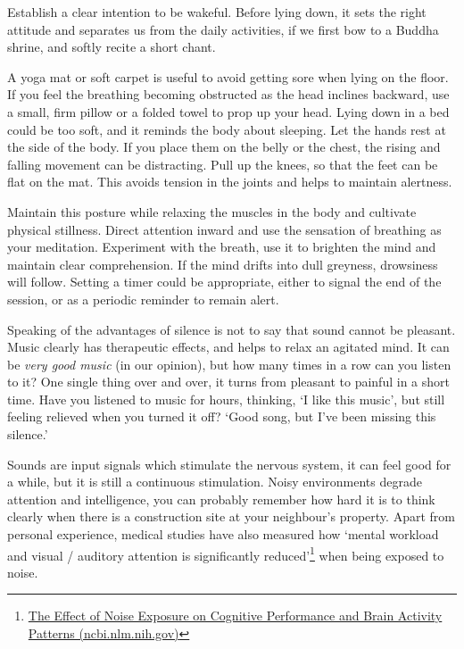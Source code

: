 Establish a clear intention to be wakeful. Before lying down, it sets
the right attitude and separates us from the daily activities, if we
first bow to a Buddha shrine, and softly recite a short chant.

\clearpage
\thispagestyle{empty}\mbox{}
\clearpage

A yoga mat or soft carpet is useful to avoid getting sore when lying on
the floor. If you feel the breathing becoming obstructed as the head
inclines backward, use a small, firm pillow or a folded towel to prop up
your head. Lying down in a bed could be too soft, and it reminds the
body about sleeping. Let the hands rest at the side of the body. If you
place them on the belly or the chest, the rising and falling movement
can be distracting. Pull up the knees, so that the feet can be flat on
the mat. This avoids tension in the joints and helps to maintain
alertness.

Maintain this posture while relaxing the muscles in the body and
cultivate physical stillness. Direct attention inward and use the
sensation of breathing as your meditation. Experiment with the breath,
use it to brighten the mind and maintain clear comprehension. If the
mind drifts into dull greyness, drowsiness will follow. Setting a timer
could be appropriate, either to signal the end of the session, or as a
periodic reminder to remain alert.


Speaking of the advantages of silence is not to say that sound cannot be
pleasant. Music clearly has therapeutic effects, and helps to relax an
agitated mind. It can be \emph{very good music} (in our opinion), but
how many times in a row can you listen to it? One single thing over and
over, it turns from pleasant to painful in a short time. Have you
listened to music for hours, thinking, `I like this music', but still
feeling relieved when you turned it off? `Good song, but I've been
missing this silence.'

Sounds are input signals which stimulate the nervous system, it can feel
good for a while, but it is still a continuous stimulation. Noisy
environments degrade attention and intelligence, you can probably
remember how hard it is to think clearly when there is a construction
site at your neighbour's property. Apart from personal experience,
medical studies have also measured how `mental workload and visual /
auditory attention is significantly reduced'\footnote{\href{https://www.ncbi.nlm.nih.gov/pmc/articles/PMC6901841/}{The
  Effect of Noise Exposure on Cognitive Performance and Brain Activity
  Patterns (ncbi.nlm.nih.gov)}} when being exposed to noise.

